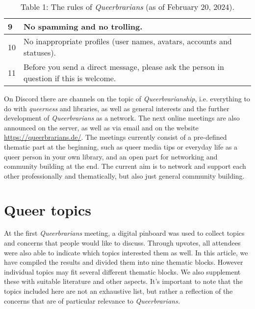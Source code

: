 \documentclass[a4paper,
fontsize=11pt,
oneside,
numbers=noperiodatend,
parskip=half-,
bibliography=totoc,
final
]{scrartcl}
\begin{document}
\begin{table}[h]
\begin{tabular}{|ll|}
\multicolumn{1}{|l|}{9}  & No spamming and no trolling.                                                                                                                                               \\ \hline
\multicolumn{1}{|l|}{10} & No inappropriate profiles (user names, avatars, accounts and statuses).                                                                                                    \\ \hline
\multicolumn{1}{|l|}{11} & Before you send a direct message, please ask the person in question if this is welcome.                                                                                    \\ \hline
\end{tabular}
\caption{Table 1: The rules of \emph{Queerbrarians} (as of February 20, 2024).}
\end{table}

On Discord there are channels on the topic of \emph{Queerbrarianship},
i.e. everything to do with \emph{queerness} and libraries, as well as
general interests and the further development of \emph{Queerbrarians} as
a network. The next online meetings are also announced on the server, as
well as via email and on the website \url{https://queerbrarians.de/}.
The meetings currently consist of a pre-defined thematic part at the
beginning, such as queer media tips or everyday life as a queer person
in your own library, and an open part for networking and community
building at the end. The current aim is to network and support each
other professionally and thematically, but also just general community
building.

\hypertarget{queer-topics}{%
\section{Queer topics}\label{queer-topics}}

At the first \emph{Queerbrarians} meeting, a digital pinboard was used
to collect topics and concerns that people would like to discuss.
Through upvotes, all attendees were also able to indicate which topics
interested them as well. In this article, we have compiled the results
and divided them into nine thematic blocks. However individual topics
may fit several different thematic blocks. We also supplement these with
suitable literature and other aspects. It's important to note that the
topics included here are not an exhaustive list, but rather a reflection
of the concerns that are of particular relevance to
\emph{Queerbrarians.}
\end{document}
